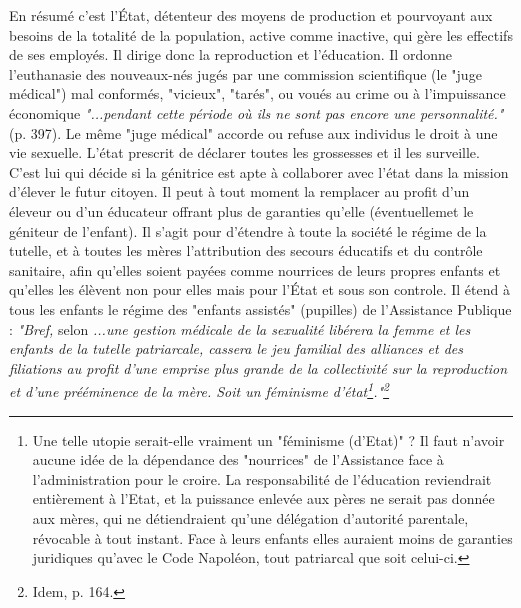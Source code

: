  En résumé  c'est l'État, détenteur des moyens de production et pourvoyant aux besoins de la totalité de la population, active comme inactive, qui gère les effectifs de ses employés. Il dirige donc la reproduction et l'éducation. Il ordonne l'euthanasie des nouveaux-nés jugés par une commission scientifique (le "juge médical") mal conformés, "vicieux", "tarés", ou voués au crime ou à l'impuissance économique \emph{"...pendant cette période où ils ne sont pas encore une personnalité."} (p. 397). Le même "juge médical" accorde ou refuse aux individus le droit à une vie sexuelle. L'état prescrit de déclarer toutes les grossesses et il les surveille. C'est lui qui décide si la génitrice est apte à collaborer avec l'état dans la mission d'élever le futur citoyen. Il peut à tout moment la remplacer au profit d'un éleveur ou d'un éducateur offrant plus de garanties qu'elle (éventuellemet le géniteur de l'enfant). Il s'agit pour  d'étendre à toute la société le régime de la tutelle, et à toutes les mères l'attribution des secours éducatifs et du contrôle sanitaire, afin qu'elles soient payées comme nourrices de leurs propres enfants et qu'elles les élèvent non pour elles mais pour l'État et sous son controle. Il étend à tous les enfants le régime des "enfants assistés" (pupilles)  de l'Assistance Publique : \emph{"Bref,} selon   \emph{...une gestion médicale de la sexualité libérera la femme et les enfants de la tutelle patriarcale, cassera le jeu familial des alliances et des filiations au profit d'une emprise plus grande de la collectivité sur la reproduction et d'une prééminence de la mère. Soit un féminisme d'état\footnote{Une telle utopie serait-elle vraiment un "féminisme (d'Etat)" ? Il faut n'avoir aucune idée de la dépendance des "nourrices" de l'Assistance face à l'administration pour le croire. La responsabilité de l'éducation reviendrait entièrement à l'Etat, et la puissance enlevée aux pères ne serait pas donnée aux mères, qui ne détiendraient qu'une délégation d'autorité parentale, révocable à tout instant. Face à leurs enfants elles auraient moins de garanties juridiques qu'avec le Code Napoléon, tout patriarcal que soit celui-ci.}."\footnote{Idem, p. 164.}}
 



